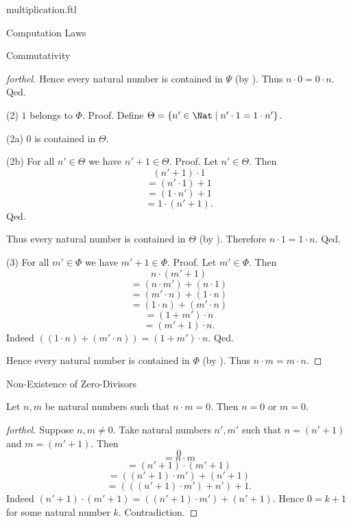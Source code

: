 \documentclass{naproche-library}
\begin{document}
\begin{smodule}[title=Multiplication]{multiplication.ftl}
\begin{sfragment}{Computation Laws}
\begin{sfragment}{Commutativity}
\begin{proof}[forthel]
        Hence every natural number is contained in $\Psi$ (by ).
        Thus $n \cdot 0 = 0 \cdot n$.
      Qed.

      (2) $1$ belongs to $\Phi$. \newline
      Proof.
        Define $\Theta = \{ n' \in \Nat \mid n' \cdot 1 = 1 \cdot n' \}$.

        (2a) $0$ is contained in $\Theta$.

        (2b) For all $n' \in \Theta$ we have $n' + 1 \in \Theta$. \newline
        Proof.
          Let $n' \in \Theta$.
          Then
          \[  (n' + 1) \cdot 1        \]
          \[    = (n' \cdot 1) + 1    \]
          \[    = (1 \cdot n') + 1    \]
          \[    = 1 \cdot (n' + 1).   \]
        Qed.

        Thus every natural number is contained in $\Theta$ (by ).
        Therefore $n \cdot 1 = 1 \cdot n$.
      Qed.

      (3) For all $m' \in \Phi$ we have $m' + 1 \in \Phi$. \newline
      Proof.
        Let $m' \in \Phi$.
        Then
        \[  n \cdot (m' + 1)                \]
        \[    = (n \cdot m') + (n \cdot 1)  \]
        \[    = (m' \cdot n) + (1 \cdot n)  \]
        \[    = (1 \cdot n) + (m' \cdot n)  \]
        \[    = (1 + m') \cdot n            \]
        \[    = (m' + 1) \cdot n.           \]
        Indeed $((1 \cdot n) + (m' \cdot n)) = (1 + m') \cdot n$. %
      Qed.

      Hence every natural number is contained in $\Phi$ (by ).
      Thus $n \cdot m = m \cdot n$.
    \end{proof}
  \end{sfragment}

  \begin{sfragment}{Non-Existence of Zero-Divisors}
    \begin{proposition}[forthel,id=ARITHMETIC_06_3843962875936768]
      Let $n, m$ be natural numbers such that $n \cdot m = 0$.
      Then $n = 0$ or $m = 0$.
    \end{proposition}
    \begin{proof}[forthel]
      Suppose $n, m \neq 0$.
      Take natural numbers $n', m'$ such that $n = (n' + 1)$ and $m = (m' + 1)$.
      Then
      \[  0                                     \]
      \[    = n \cdot m                         \]
      \[    = (n' + 1) \cdot (m' + 1)           \]
      \[    = ((n' + 1) \cdot m') + (n' + 1)    \]
      \[    = (((n' + 1) \cdot m') + n') + 1.   \]
      Indeed $(n' + 1) \cdot (m' + 1) = ((n' + 1) \cdot m') + (n' + 1)$.
      Hence $0 = k + 1$ for some natural number $k$.
      Contradiction.
    \end{proof}
  \end{sfragment}


\end{sfragment}
\end{smodule}
\end{document}
